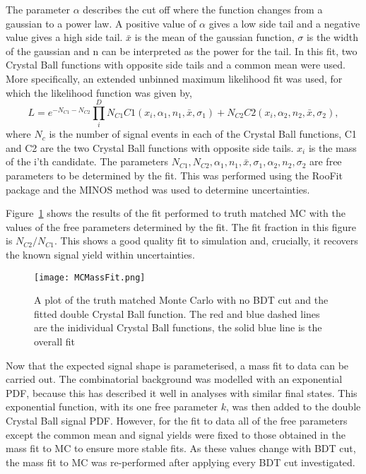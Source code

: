   The parameter $\alpha$ describes the cut off where the function changes from a gaussian to a power law. A positive value of $\alpha$ gives a low side tail and a negative value gives a high side tail.  $\bar{x}$ is the mean of the gaussian function, $\sigma$ is the width of the gaussian and n can be interpreted as the power for the tail.  In this fit, two Crystal Ball functions with opposite side tails and a common mean were used.  More specifically, an extended unbinned maximum likelihood fit was used, for which the likelihood function was given by,
  \begin{equation}
    L=e^{-N_{C1}-N_{C2}}\prod_i^{D}N_{C1}C1(x_i,\alpha_1,n_1,\bar{x},\sigma_1)+N_{C2}C2(x_i,\alpha_2,n_2,\bar{x},\sigma_2),
  \end{equation}
where $N_{c}$ is the number of signal events in each of the Crystal Ball functions, C1 and C2 are the two Crystal Ball functions with opposite side tails.  $x_{i}$ is the mass of the i'th \Bd candidate. The parameters $N_{C1}, N_{C2},\alpha_1, n_1,\bar{x}, \sigma_1, \alpha_2,n_2,\sigma_2$ are free parameters to be determined by the fit.  This was performed using the RooFit package and the MINOS method was used to determine uncertainties\cite{Verkerke:2003ir}.

  Figure~\ref{fig:MCfit} shows the results of the fit performed to truth matched MC with the values of the free parameters determined by the fit.  The fit fraction in this figure is $N_{C2}/N_{C1}$.  This shows a good quality fit to simulation  and, crucially, it recovers the known signal yield within uncertainties.

  \begin{figure}[h]
    \centering
    \texttt{[image: MCMassFit.png]}
    \caption{A plot of the truth matched Monte Carlo with no BDT cut and the fitted double Crystal Ball function.  The red and blue dashed lines are the inidividual Crystal Ball functions, the solid blue line is the overall fit}
    \label{fig:MCfit}
  \end{figure}

  Now that the expected signal shape is parameterised, a mass fit to data can be carried out.  The combinatorial background was modelled with an exponential PDF, because this has described it well in analyses with similar final states\cite{LHCb-PAPER-2015-019}.  This exponential function, with its one free parameter $k$, was then added to the double Crystal Ball signal PDF.  However, for the fit to data all of the free parameters except the common mean and signal yields were fixed to those obtained in the mass fit to MC to ensure more stable fits.  As these values change with BDT cut, the mass fit to MC was re-performed after applying every BDT cut investigated.

